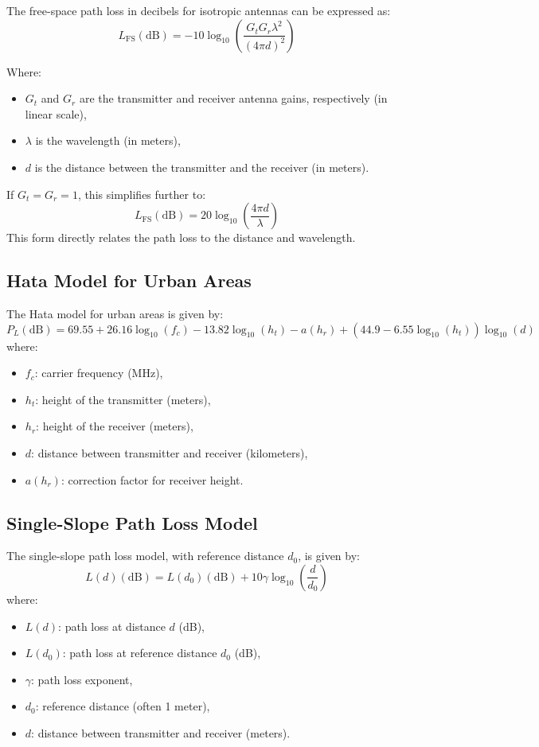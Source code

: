 \documentclass[a4paper,12pt]{book}
\begin{document}
	The free-space path loss in decibels for isotropic antennas can be expressed as:
	\[
	L_{\text{FS}} (\text{dB}) = -10 \log_{10} \left( \frac{G_t G_r \lambda^2}{(4 \pi d)^2} \right)
	\]
	
	Where:
	\begin{itemize}
		\item \( G_t \) and \( G_r \) are the transmitter and receiver antenna gains, respectively (in linear scale),
		\item \( \lambda \) is the wavelength (in meters),
		\item \( d \) is the distance between the transmitter and the receiver (in meters).
	\end{itemize}
	
	If \(G_t = G_r = 1\), this simplifies further to:
	\[
	L_{\text{FS}} (\text{dB}) = 20 \log_{10} \left( \frac{4 \pi d}{\lambda} \right)
	\]
	This form directly relates the path loss to the distance and wavelength.
	
	\subsection{Hata Model for Urban Areas}
	The Hata model for urban areas is given by:
	\[
	P_L(\text{dB}) = 69.55 + 26.16 \log_{10}(f_c) - 13.82 \log_{10}(h_t) - a(h_r) + \left( 44.9 - 6.55 \log_{10}(h_t) \right) \log_{10}(d)
	\]
	where:
	\begin{itemize}
		\item \( f_c \): carrier frequency (MHz),
		\item \( h_t \): height of the transmitter (meters),
		\item \( h_r \): height of the receiver (meters),
		\item \( d \): distance between transmitter and receiver (kilometers),
		\item \( a(h_r) \): correction factor for receiver height.
	\end{itemize}
	
	\subsection{Single-Slope Path Loss Model}
	The single-slope path loss model, with reference distance \(d_0\), is given by:
	\[
	L(d) (\text{dB}) = L(d_0) (\text{dB}) + 10 \gamma \log_{10} \left( \frac{d}{d_0} \right)
	\]
	where:
	\begin{itemize}
		\item \( L(d) \): path loss at distance \( d \) (dB),
		\item \( L(d_0) \): path loss at reference distance \( d_0 \) (dB),
		\item \( \gamma \): path loss exponent,
		\item \( d_0 \): reference distance (often 1 meter),
		\item \( d \): distance between transmitter and receiver (meters).
	\end{itemize}
	
\end{document}
